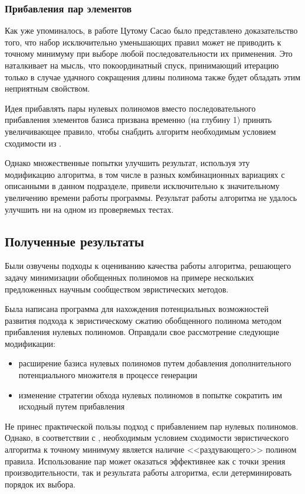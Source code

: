 \documentclass[a4paper,12pt,titlepage,finall]{article}
\begin{document}
\subsubsection{Прибавления пар элементов}

Как уже упоминалось, в работе Цутому Сасао \cite{convergence} было представлено доказательство того, что набор исключительно уменьшающих правил может не приводить к точному минимуму при выборе любой последовательности их применения. Это наталкивает на мысль, что покоординатный спуск, принимающий итерацию только в случае удачного сокращения длины полинома также будет обладать этим неприятным свойством.

Идея прибавлять пары нулевых полиномов вместо последовательного прибавления элементов базиса призвана временно (на глубину 1) принять увеличивающее правило, чтобы снабдить алгоритм необходимым условием сходимости из \cite{convergence}.

Однако множественные попытки улучшить результат, используя эту модификацию алгоритма, в том числе в разных комбинационных вариациях с описанными в данном подразделе, привели исключительно к значительному увеличению времени работы программы. Результат работы алгоритма не удалось улучшить ни на одном из проверяемых тестах.

\subsection{Полученные результаты}

Были озвучены подходы к оцениванию качества работы алгоритма, решающего задачу минимизации обобщенных полиномов на примере нескольких предложенных научным сообществом эвристических методов.

Была написана программа для нахождения потенциальных возможностей развития подхода к эвристическому сжатию обобщенного полинома методом прибавления нулевых полиномов. Оправдали свое рассмотрение следующие модификации:
\begin{itemize}
    \item расширение базиса нулевых полиномов путем добавления дополнительного потенциального множителя в процессе генерации
    \item изменение стратегии обхода нулевых полиномов в попытке сократить им исходный путем прибавления
\end{itemize}

Не принес практической пользы подход с прибавлением пар нулевых полиномов. Однако, в соответствии с \cite{convergence}, необходимым условием сходимости эвристического алгоритма к точному минимуму является наличие <<раздувающего>> полином правила. Использование пар может оказаться эффективнее как с точки зрения производительности, так и результата работы алгоритма, если детерминировать порядок их выбора.
\end{document}
